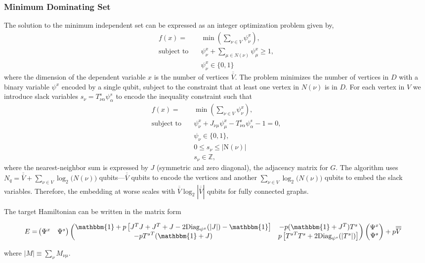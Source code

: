 \documentclass[prd,twocolumn,tightenlines,preprintnumbers,showpacs,superscriptaddress,notitlepage,nofootinbib,eqsecnum,floatfix,longbibliography]{revtex4}
\begin{document}
\subsubsection{Minimum Dominating Set}
The solution to the minimum independent set can be expressed as an integer optimization problem given by,
\begin{align}
f(x) = &\min(\sum_{\nu \in V} \psi^x_{\nu}),\\
\textrm{subject to} \quad & \psi^x_{\nu} + \sum_{\mu \in \mathit{N}(\nu)} \psi^x_{\mu} \geq 1,\\
& \psi^x_{\nu} \in \{0, 1\}
\end{align}
where the dimension of the dependent variable $x$ is the number of vertices $\overline{\overline{V}}$.
The problem minimizes the number of vertices in $D$ with a binary variable $\psi^x$ encoded by a single qubit, subject to the constraint that at least one vertex in $\mathit{N}(\nu)$ is in $D$. For each vertex in $V$ we introduce slack variables $s_{\nu} = T^s_{\nu \alpha} \psi^s_{\alpha}$ to encode the inequality constraint such that
\begin{align}
f(x) = &\min(\sum_{\nu\in V} \psi^x_{\nu}),\\
\textrm{subject to} \quad & \psi^x_{\nu} + J_{\nu \mu} \psi^x_{\mu}- T^s_{\nu \alpha} \psi^s_{\alpha}  - 1 = 0,\\
& \psi_{\nu} \in \{0, 1\},\\
& 0 \leq s_{\nu} \leq |\mathrm{N}(\nu)|\\
& s_{\nu} \in \mathbb{Z},
\end{align}
where the nearest-neighbor sum is expressed by $J$ (symmetric and zero diagonal), the adjacency matrix for $G$.
The algorithm uses $N_q = \overline{\overline{V}} + \sum_{\nu \in V} \log_2 \mathit(N(\nu))$ qubits---$\overline{\overline{V}}$ qubits to encode the vertices and another $\sum_{\nu \in V} \log_2 \mathit(N(\nu))$ qubits to embed the slack variables. Therefore, the embedding at worse scales with $\overline{\overline{V}} \log_2 |\overline{\overline{V}}|$ qubits for fully connected graphs.

The target Hamiltonian can be written in the matrix form
\begin{widetext}
\begin{align}
E = &
\begin{pmatrix}
\Psi^x & \Psi^s
\end{pmatrix}
\begin{pmatrix}
\mathbbm{1} + p\left[J^T J + J^T + J - 2 \mathrm{Diag}_{\psi^x}(|J|) - \mathbbm{1} \right] & - p(\mathbbm{1}+J^T)T^s\\
- p{T^s}^T(\mathbbm{1}+J)& p\left[{T^s}^T T^s + 2\mathrm{Diag}_{\psi^s}(|T^s|)\right]
\end{pmatrix}
\begin{pmatrix}
\Psi^x\\ \Psi^s
\end{pmatrix} + p \overline{\overline{V}}
\label{eq:matrix_form}
\end{align}
\end{widetext}
where $ |M| \equiv \sum_{\nu} M_{\nu \mu}$.
\end{document}
